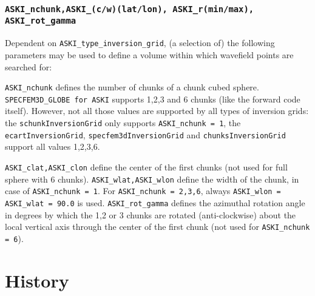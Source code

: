 \documentclass[12pt,a4paper]{article}
\newcommand{\lcode}[1]{\nolinkurl{#1}}
\begin{document}
\subsubsection*{\lcode{ASKI_nchunk,ASKI_(c/w)(lat/lon), ASKI_r(min/max), ASKI_rot_gamma}}
Dependent on \lcode{ASKI_type_inversion_grid}, (a selection of) the following parameters may be used to define a volume 
within which wavefield points are searched for:

\lcode{ASKI_nchunk} defines the number of chunks of a chunk cubed sphere. 
\lcode{SPECFEM3D_GLOBE for ASKI} supports 1,2,3 and 6 chunks (like the forward code itself).
However, not all those values are supported by all types of inversion grids: 
the \lcode{schunkInversionGrid} only supports \lcode{ASKI_nchunk = 1},
the \lcode{ecartInversionGrid}, \lcode{specfem3dInversionGrid} and \lcode{chunksInversionGrid} support 
all values 1,2,3,6.

\lcode{ASKI_clat,ASKI_clon} define the center of the first chunks (not used for full sphere with 6 chunks).
\lcode{ASKI_wlat,ASKI_wlon} define the width of the chunk, in case of \lcode{ASKI_nchunk = 1}. 
For \lcode{ASKI_nchunk = 2,3,6}, always \lcode{ASKI_wlon = ASKI_wlat = 90.0} is used.
\lcode{ASKI_rot_gamma} defines the azimuthal rotation angle in degrees by which the 1,2 or 3 chunks are 
rotated (anti-clockwise) about the local vertical axis through the center of the first chunk (not used 
for \lcode{ASKI_nchunk = 6}).
%


%
\newpage
\section*{History}

%
\newpage

%
\end{document}

